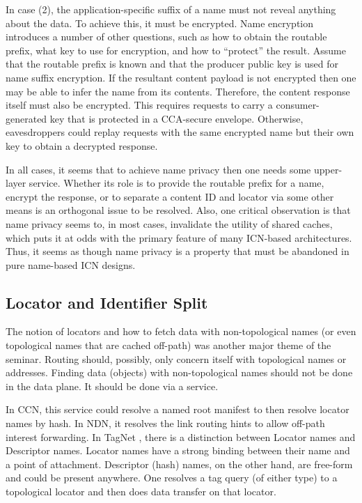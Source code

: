 In case (2), the application-specific suffix of a name must not reveal anything about
the data. To achieve this, it must be encrypted. Name encryption introduces a number
of other questions, such as how to obtain the routable prefix, what key to use for
encryption, and how to ``protect'' the result. Assume that the routable prefix is
known and that the producer public key is used for name suffix encryption. If the
resultant content payload is not encrypted then one may be able to infer the name
from its contents. Therefore, the content response itself must also be encrypted.
This requires requests to carry a consumer-generated key that is protected in a
CCA-secure envelope. Otherwise, eavesdroppers could replay requests with the same
encrypted name but their own key to obtain a decrypted response.

In all cases, it seems that to achieve name privacy then one needs some upper-layer
service. Whether its role is to provide the routable prefix for a name, encrypt the
response, or to separate a content ID and locator via some other means is an orthogonal
issue to be resolved. Also, one critical observation is that name privacy seems to, in most cases, invalidate the utility of
shared caches, which puts it at odds with the primary feature of many ICN-based
architectures. Thus, it seems as though name privacy is a property that must be
abandoned in pure name-based ICN designs.


\subsection{Locator and Identifier Split}
The notion of locators and how to fetch data with non-topological names (or
even topological names that are cached off-path) was another major theme of
the seminar. Routing should, possibly, only concern
itself with topological names or addresses. Finding data (objects) with non-topological
names should not be done in the data plane. It should be done via a service.

In CCN, this service could resolve a named root manifest to then resolve locator names by hash.
In NDN, it resolves the link routing hints to allow off-path interest forwarding. In TagNet \cite{papalini2015tagnet},
there is a distinction between Locator names and Descriptor names. Locator names have a
strong binding between their name and a point of attachment. Descriptor (hash) names, on the
other hand, are free-form and could be present anywhere.  One resolves a tag query (of either
type) to a topological locator and then does data transfer on that locator.

